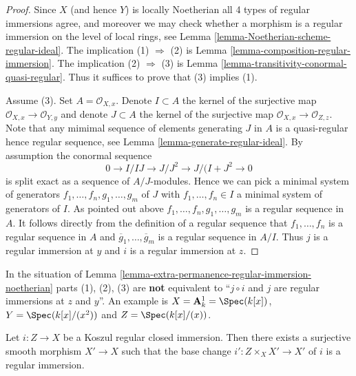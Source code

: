 \begin{proof}
Since $X$ (and hence $Y$) is locally Noetherian all 4 types of regular
immersions agree, and moreover we may check whether a morphism is a
regular immersion on the level of local rings, see
Lemma \ref{lemma-Noetherian-scheme-regular-ideal}.
The implication (1) $\Rightarrow$ (2) is
Lemma \ref{lemma-composition-regular-immersion}.
The implication (2) $\Rightarrow$ (3) is
Lemma \ref{lemma-transitivity-conormal-quasi-regular}.
Thus it suffices to prove that (3) implies (1).

\medskip\noindent
Assume (3). Set $A = \mathcal{O}_{X, x}$. Denote $I \subset A$ the kernel
of the surjective map $\mathcal{O}_{X, x} \to \mathcal{O}_{Y, y}$ and
denote $J \subset A$ the kernel
of the surjective map $\mathcal{O}_{X, x} \to \mathcal{O}_{Z, z}$.
Note that any mimimal sequence of elements generating $J$ in $A$
is a quasi-regular hence regular sequence, see
Lemma \ref{lemma-generate-regular-ideal}.
By assumption the conormal sequence
$$
0 \to I/IJ \to J/J^2 \to J/(I + J^2 \to 0
$$
is split exact as a sequence of $A/J$-modules. Hence we can pick
a minimal system of generators $f_1, \ldots, f_n, g_1, \ldots, g_m$
of $J$ with $f_1, \ldots, f_n \in I$ a minimal system of generators of $I$.
As pointed out above $f_1, \ldots, f_n, g_1, \ldots, g_m$ is a regular
sequence in $A$. It follows directly from the definition of a regular
sequence that $f_1, \ldots, f_n$ is a regular sequence in $A$ and
$\overline{g}_1, \ldots, \overline{g}_m$ is a regular sequence in
$A/I$. Thus $j$ is a regular immersion at $y$ and $i$ is a regular
immersion at $z$.
\end{proof}

\begin{remark}
\label{remark-not-always-extra-permance}
In the situation of
Lemma \ref{lemma-extra-permanence-regular-immersion-noetherian}
parts (1), (2), (3) are {\bf not} equivalent to
``$j \circ i$ and $j$ are regular immersions at $z$ and $y$''.
An example is $X = \mathbf{A}^1_k = \Spec(k[x])$,
$Y = \Spec(k[x]/(x^2))$ and $Z = \Spec(k[x]/(x))$.
\end{remark}

\begin{lemma}
\label{lemma-koszul-regular-smooth-locally-regular}
Let $i : Z \to X$ be a Koszul regular closed immersion.
Then there exists a surjective smooth morphism $X' \to X$ such
that the base change $i' : Z \times_X X' \to X'$ of $i$ is
a regular immersion.
\end{lemma}

